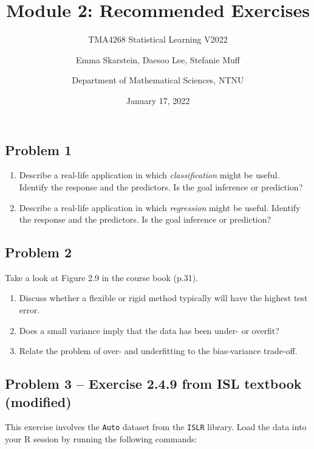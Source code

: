 \documentclass[
]{article}
\title{Module 2: Recommended Exercises}
\subtitle{TMA4268 Statistical Learning V2022}
\author{Emma Skarstein, Daesoo Lee, Stefanie Muff \and Department of
Mathematical Sciences, NTNU}
\date{January 17, 2022}
\providecommand{\tightlist}{%
  \setlength{\itemsep}{0pt}\setlength{\parskip}{0pt}}
\begin{document}
\maketitle

\hypertarget{problem-1}{%
\subsection{Problem 1}\label{problem-1}}

\begin{enumerate}
\def\labelenumi{\alph{enumi})}
\tightlist
\item
  Describe a real-life application in which \emph{classification} might
  be useful. Identify the response and the predictors. Is the goal
  inference or prediction?
\item
  Describe a real-life application in which \emph{regression} might be
  useful. Identify the response and the predictors. Is the goal
  inference or prediction?
\end{enumerate}

\hypertarget{problem-2}{%
\subsection{Problem 2}\label{problem-2}}

Take a look at Figure 2.9 in the course book (p.31).

\begin{enumerate}
\def\labelenumi{\alph{enumi})}
\tightlist
\item
  Discuss whether a flexible or rigid method typically will have the
  highest test error.
\item
  Does a small variance imply that the data has been under- or overfit?
\item
  Relate the problem of over- and underfitting to the bias-variance
  trade-off.
\end{enumerate}

\hypertarget{problem-3-exercise-2.4.9-from-isl-textbook-modified}{%
\subsection{Problem 3 -- Exercise 2.4.9 from ISL textbook
(modified)}\label{problem-3-exercise-2.4.9-from-isl-textbook-modified}}

This exercise involves the \texttt{Auto} dataset from the \texttt{ISLR}
library. Load the data into your R session by running the following
commands:
\end{document}
